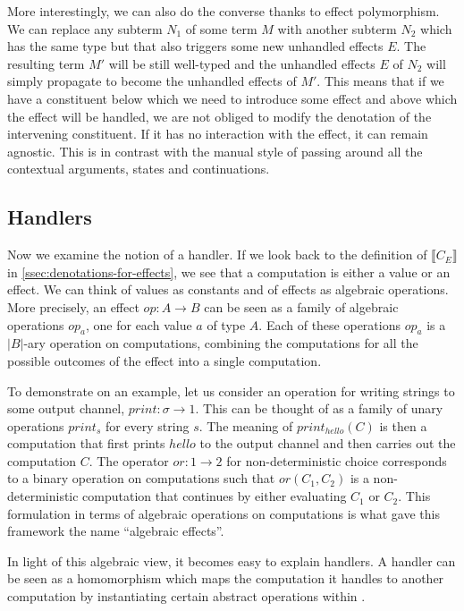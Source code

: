 \documentclass{article}
\newcommand{\sem}[1]{\llbracket #1 \rrbracket}
\begin{document}
More interestingly, we can also do the converse thanks to effect
polymorphism. We can replace any subterm $N_1$ of some term $M$ with another
subterm $N_2$ which has the same type but that also triggers some new
unhandled effects $E$. The resulting term $M'$ will be still well-typed and
the unhandled effects $E$ of $N_2$ will simply propagate to become the
unhandled effects of $M'$. This means that if we have a constituent below
which we need to introduce some effect and above which the effect will be
handled, we are not obliged to modify the denotation of the intervening
constituent. If it has no interaction with the effect, it can remain
agnostic. This is in contrast with the manual style of passing around all the
contextual arguments, states and continuations.

\subsection{Handlers}

Now we examine the notion of a handler. If we look back to the definition of
$\sem{C_E}$ in \ref{ssec:denotations-for-effects}, we see that a computation
is either a value or an effect. We can think of values as constants and of
effects as algebraic operations. More precisely, an effect $op : A \to B$ can
be seen as a family of algebraic operations $op_a$, one for each value $a$ of
type $A$. Each of these operations $op_a$ is a $\left| B \right|$-ary
operation on computations, combining the computations for all the possible
outcomes of the effect into a single computation.

To demonstrate on an example, let us consider an operation for writing strings
to some output channel, $print : \sigma \to 1$. This can be thought of as a
family of unary operations $print_s$ for every string $s$. The meaning of
$print_{hello}(C)$ is then a computation that first prints $hello$ to the
output channel and then carries out the computation $C$. The operator $or : 1
\to 2$ for non-deterministic choice corresponds to a binary operation on
computations such that $or(C_1, C_2)$ is a non-deterministic computation that
continues by either evaluating $C_1$ or $C_2$. This formulation in terms of
algebraic operations on computations is what gave this framework the name
``algebraic effects''.

In light of this algebraic view, it becomes easy to explain handlers. A
handler can be seen as a homomorphism which maps the computation it handles to
another computation by instantiating certain abstract operations within
\citep{plotkin2009handlers} \citep{pretnar2010logic}.
\end{document}
